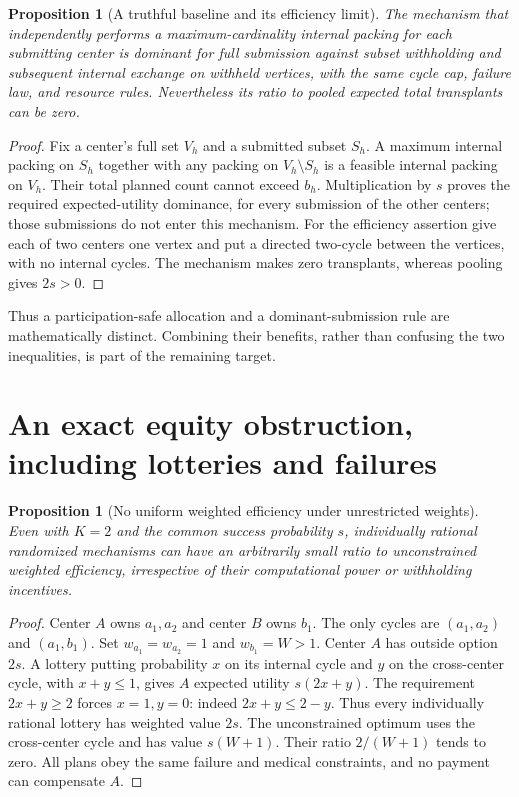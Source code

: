 \documentclass[11pt]{article}
\newtheorem{proposition}[theorem]{Proposition}
\theoremstyle{remark}
\begin{document}
\begin{proposition}[A truthful baseline and its efficiency limit]
The mechanism that independently performs a maximum-cardinality internal
packing for each submitting center is dominant for full submission
against subset withholding and subsequent internal exchange on withheld
vertices, with the same cycle cap, failure law, and resource rules.
Nevertheless its ratio to pooled expected total transplants can be zero.
\end{proposition}
\begin{proof}
Fix a center's full set $V_h$ and a submitted subset $S_h$. A maximum
internal packing on $S_h$ together with any packing on
$V_h\setminus S_h$ is a feasible internal packing on $V_h$. Their total
planned count cannot exceed $b_h$. Multiplication by $s$ proves the
required expected-utility dominance, for every submission of the
other centers; those submissions do not enter this mechanism.
For the efficiency assertion give each of two centers one vertex and
put a directed two-cycle between the vertices, with no internal cycles.
The mechanism makes zero transplants, whereas pooling gives $2s>0$.
\end{proof}

Thus a participation-safe allocation and a dominant-submission rule
are mathematically distinct. Combining their benefits, rather than
confusing the two inequalities, is part of the remaining target.

\section{An exact equity obstruction, including lotteries and failures}
\begin{proposition}[No uniform weighted efficiency under unrestricted weights]
Even with $K=2$ and the common success probability $s$, individually
rational randomized mechanisms can have an arbitrarily small ratio to
unconstrained weighted efficiency, irrespective of their computational
power or withholding incentives.
\end{proposition}
\begin{proof}
Center $A$ owns $a_1,a_2$ and center $B$ owns $b_1$. The only cycles are
$(a_1,a_2)$ and $(a_1,b_1)$. Set $w_{a_1}=w_{a_2}=1$ and $w_{b_1}=W>1$.
Center $A$ has outside option $2s$. A lottery putting probability $x$
on its internal cycle and $y$ on the cross-center cycle, with
$x+y\leq1$, gives $A$ expected utility $s(2x+y)$. The requirement
$2x+y\geq2$ forces $x=1,y=0$: indeed $2x+y\leq2-y$.
Thus every individually rational lottery has weighted value $2s$.
The unconstrained optimum uses the cross-center cycle and has value
$s(W+1)$. Their ratio $2/(W+1)$ tends to zero. All plans obey the same
failure and medical constraints, and no payment can compensate $A$.
\end{proof}
\end{document}

